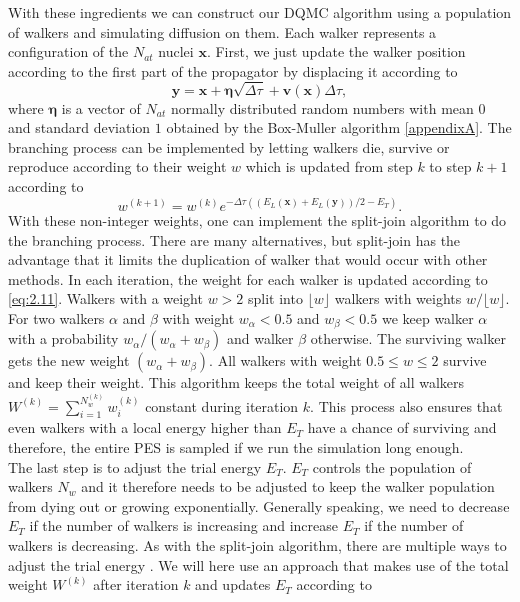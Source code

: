 \documentclass [12pt]{report}
\begin{document}
With these ingredients we can construct our DQMC algorithm using a population of walkers and simulating diffusion on them. Each walker represents a configuration of the $N_{at}$ nuclei $\bm{x}$. First, we just update the walker position according to the first part of the propagator by displacing it according to
\begin{equation}\label{eq:2.10}
\bm{y} = \bm{x} + \bm{\eta}\sqrt{\Delta \tau} + \bm{v}(\bm{x})\Delta \tau,
\end{equation}
where $\bm{\eta}$ is a vector of $N_{at}$ normally distributed random numbers with mean $0$ and standard deviation $1$ obtained by the Box-Muller algorithm \ref{appendixA}.
The branching process can be implemented by letting walkers die, survive or reproduce according to their weight $w$ which is updated from step $k$ to step $k+1$ according to 
\begin{equation}\label{eq:2.11} 
w^{(k+1)} = w^{(k)} e^{-\Delta \tau ((E_L(\bm{x}) + E_L(\bm{y}))/2 - E_T)}.
\end{equation}
With these non-integer weights, one can implement the split-join algorithm \cite{split_join} to do the branching process. There are many alternatives, but split-join has the advantage that it limits the duplication of walker that would occur with other methods.
 In each iteration, the weight for each walker is updated according to \eqref{eq:2.11}. Walkers with a weight $w > 2$ split into $\lfloor w \rfloor$ walkers with weights $w/\lfloor w \rfloor$. For two walkers $\alpha$ and $\beta$ with weight $w_\alpha < 0.5$ and $w_\beta < 0.5$ we keep walker $\alpha$  with a probability $w_\alpha/(w_\alpha + w_\beta)$ and walker $\beta$ otherwise. The surviving walker gets the new weight $(w_\alpha + w_\beta)$. All walkers with weight $0.5 \leq w \leq 2$ survive and keep their weight. This algorithm keeps the total weight of all walkers $W^{(k)} =  \sum_{i = 1}^{N_w^{(k)}} w_i^{(k)}$ constant during iteration $k$.
 This process also ensures that even walkers with a local energy higher than $E_T$ have a chance of surviving and therefore, the entire PES is sampled if we run the simulation long enough. \\
The last step is to adjust the trial energy $E_T$. $E_T$ controls the population of walkers $N_w$ and it therefore needs to be adjusted to keep the walker population from dying out or growing exponentially. Generally speaking, we need to decrease $E_T$ if the number of walkers is increasing and increase $E_T$ if the number of walkers is decreasing.  As with the split-join algorithm, there are multiple ways to adjust the trial energy \cite{mccoy,alavi}. We will here use an approach \cite{cyrus} that makes use of the total weight $W^{(k)}$ after iteration $k$ and updates $E_T$ according to
\end{document}
